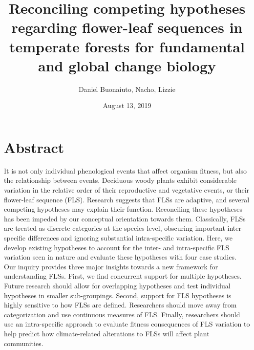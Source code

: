 \documentclass[12pt]{article}\usepackage[]{graphicx}\usepackage[]{color}
\title{Reconciling competing hypotheses regarding flower-leaf sequences in temperate forests for fundamental and global change biology}
\author{Daniel Buonaiuto, Nacho, Lizzie}
\date{August 13, 2019}
\begin{document}
\maketitle

\begin{enumerate}
\end{enumerate}
\section*{Abstract}
\indent\indent It is not only individual phenological events that affect organism fitness, but also the relationship between events. Deciduous woody plants exhibit considerable variation in the relative order of their reproductive and vegetative events, or their flower-leaf sequence (FLS). Research suggests that FLSs are adaptive, and several competing hypotheses may explain their function. Reconciling these hypotheses has been impeded by our conceptual orientation towards them. Classically, FLSs are treated as discrete categories at the species level, obscuring important inter-specific differences and ignoring substantial intra-specific variation. Here, we develop existing hypotheses to account for the inter- and intra-specific FLS variation seen in nature and evaluate these hypotheses with four case studies. Our inquiry provides three major insights towards a new framework for understanding FLSs. First, we find concurrent support for multiple hypotheses. Future research should allow for overlapping hypotheses and test individual hypotheses in smaller sub-groupings. Second, support for FLS hypotheses is highly sensitive to how FLSs are defined. Researchers should move away from categorization and use continuous measures of FLS. Finally, researchers should use an intra-specific approach to evaluate fitness consequences of FLS variation to help predict how climate-related alterations to FLSs will affect plant communities.\\


\end{document}
